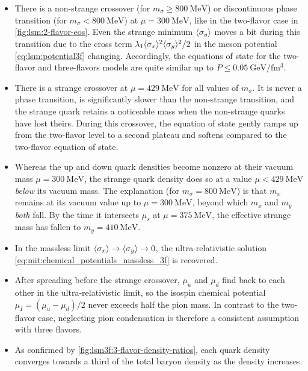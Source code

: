 \begin{itemize}
\item There is a non-strange crossover (for $m_\sigma \geq \SI{800}{\mega\electronvolt}$)
      or discontinuous phase transition (for $m_\sigma < \SI{800}{\mega\electronvolt}$)
      at $\mu=\SI{300}{\mega\electronvolt}$, like in the two-flavor case in \cref{fig:lsm:2-flavor-eos}.
      Even the strange minimum $\langle \sigma_y \rangle$ moves a bit during this transition
      due to the cross term $\lambda_1 \langle \sigma_x \rangle^2 \langle \sigma_y \rangle^2 / 2$ in the meson potential \eqref{eq:lsm:potential3f} changing.
      Accordingly, the equations of state for the two-flavor and three-flavors models are quite similar up to $P \leq \SI{0.05}{\giga\electronvolt\per\femto\meter\cubed}$.
\item There is a strange crossover at $\mu = \SI{429}{\mega\electronvolt}$ for all values of $m_\sigma$.
      It is never a phase transition, is significantly slower than the non-strange transition,
      and the strange quark retains a noticeable mass when the non-strange quarks have lost theirs.
      During this crossover, the equation of state gently ramps up from the two-flavor level to a second plateau
      and softens compared to the two-flavor equation of state.
\item Whereas the up and down quark densities become nonzero at their vacuum mass $\mu = \SI{300}{\mega\electronvolt}$,
      the strange quark density does so at a value $\mu < \SI{429}{\mega\electronvolt}$ \emph{below} its vacuum mass.
      The explanation (for $m_\sigma=\SI{800}{\mega\electronvolt}$) is that $m_x$ remains at its vacuum value up to $\mu = \SI{300}{\mega\electronvolt}$,
      beyond which $m_x$ and $m_y$ \emph{both} fall.
      By the time it intersects $\mu_s$ at $\mu = \SI{375}{\mega\electronvolt}$,
      the effective strange mass has fallen to $m_y = \SI{410}{\mega\electronvolt}$.
\item In the massless limit $\langle \sigma_x \rangle \rightarrow \langle \sigma_y \rangle \rightarrow 0$, the ultra-relativistic solution \eqref{eq:mit:chemical_potentials_massless_3f} is recovered.
\item After spreading before the strange crossover, $\mu_u$ and $\mu_d$ find back to each other in the ultra-relativistic limit,
      so the isospin chemical potential $\mu_I=(\mu_u-\mu_d)/2$ never exceeds half the pion mass.
      In contrast to the two-flavor case, neglecting pion condensation is therefore a consistent assumption with three flavors.
\item As confirmed by \cref{fig:lsm3f:3-flavor-density-ratios}, each quark density converges towards a third of the total baryon density as the density increases.

\end{itemize}
